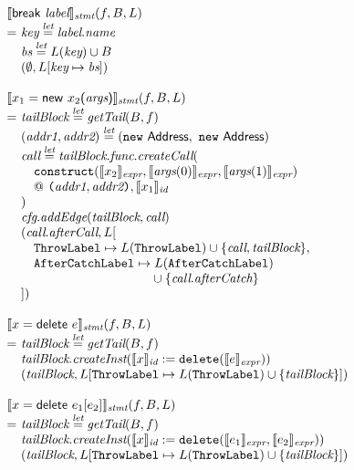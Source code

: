 \[\begin{array}{l@{}l@{~}l}
\lefteqn{\transfun{{\sf break}\ \emph{label}}_{\emph{stmt}}(f, B, L)}\\
& = & \emph{key} \letval \emph{label}.\emph{name}\\
& & \emph{bs} \letval L(\emph{key}) \cup B\\
& & (\emptyset, L[\emph{key} \mapsto \emph{bs}])\\
& & \\

\lefteqn{\transfun{\ircfgnew{x_1}{{\sf new}\ x_2}{\emph{args}}}_{\emph{stmt}}(f, B, L)}\\
& = & \emph{tailBlock} \letval \getTail(B, f)\\
& & (\emph{addr1}, \emph{addr2}) \letval (\new\ \Address,\ \new\ \Address) \\
& & \emph{call} \letval \emph{tailBlock}.\emph{func}.\emph{createCall}(\\
& & \quad \TT{construct}(\transfun{x_2}_{\emph{expr}}, \transfun{\emph{args}(0)}_{\emph{expr}}, \transfun{\emph{args}(1)}_{\emph{expr}})\\
& & \phantom{\quad }
@~ \TT{(}\emph{addr1}, \emph{addr2}\TT{)}, \transfun{x_1}_{\emph{id}}\\
& & )\\
& & \emph{cfg}.\emph{addEdge}(\emph{tailBlock}, \emph{call})\\
& & (\emph{call}.\emph{afterCall}, L[\\
& & \quad \ThrowLabel \mapsto L(\ThrowLabel) \cup \{ \emph{call}, \emph{tailBlock} \},\\
& & \quad \AfterCatchLabel \mapsto L(\AfterCatchLabel)\\
& & \phantom{\quad \AfterCatchLabel \mapsto}
\cup \{ \emph{call}.\emph{afterCatch} \}\\
& & ])\\
& & \\

\lefteqn{\transfun{\irdelete{x}{e}}_{\emph{stmt}}(f, B, L)}\\
& = & \emph{tailBlock} \letval \getTail(B, f)\\
& & \emph{tailBlock}.\emph{createInst}(\transfun{x}_{\emph{id}} := \TT{delete}(\transfun{e}_{\emph{expr}}))\\
& & (\emph{tailBlock}, L[\ThrowLabel \mapsto L(\ThrowLabel) \cup \{ \emph{tailBlock} \}])\\
& & \\

\lefteqn{\transfun{\irdeleteobj{x}{e_1}{e_2}}_{\emph{stmt}}(f, B, L)}\\
& = & \emph{tailBlock} \letval \getTail(B, f)\\
& & \emph{tailBlock}.\emph{createInst}(\transfun{x}_{\emph{id}} := \TT{delete}(\transfun{e_1}_{\emph{expr}}, \transfun{e_2}_{\emph{expr}}))\\
& & (\emph{tailBlock}, L[\ThrowLabel \mapsto L(\ThrowLabel) \cup \{ \emph{tailBlock} \}])\\
& & \\

\end{array}
\]


